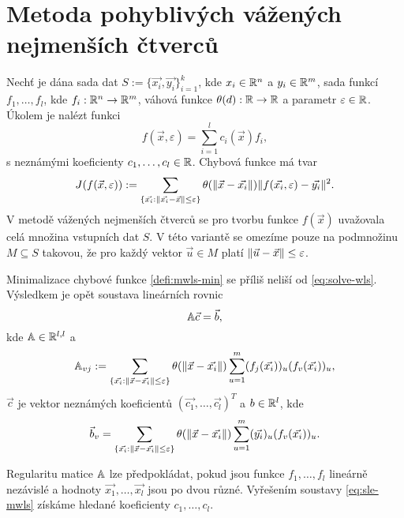 \section{Metoda pohyblivých vážených nejmenších čtverců}
\label{sec:mwls}

Nechť je dána sada dat $S := \{\vec{x_i}, \vec{y_i}\}_{i = 1}^k$, kde $x_i \in \mathbb{R}^n$ a $y_i \in \mathbb{R}^m$, sada funkcí $f_1,\ldots,f_l$, kde $f_i: \mathbb{R}^n \rightarrow \mathbb{R}^m$, váhová funkce $\theta(d): \mathbb{R} \rightarrow \mathbb{R}$ a parametr $\varepsilon \in \mathbb{R}$. Úkolem je nalézt funkci
\begin{equation}
  \label{defi:mwls}
  f(\vec{x},\varepsilon) = \sum_{i=1}^lc_i(\vec{x})f_i,
\end{equation}
s neznámými koeficienty $c_1, \ldots, c_l \in \mathbb{R}$. Chybová funkce má tvar
\begin{equation}
  \label{defi:mwls-min}
  J(f(\vec{x},\varepsilon)) := \sum_{\{\vec{x_i} : \|\vec{x_i} - \vec{x}\| \leq \varepsilon\}} \theta(\|\vec{x} - \vec{x_i}\|)\|f(\vec{x_i}, \varepsilon) - \vec{y_i}\|^2.
\end{equation}
V metodě vážených nejmenších čtverců se pro tvorbu funkce $f(\vec{x})$ uvažovala celá množina vstupních dat $S$. V této variantě se omezíme pouze na podmnožinu $M \subseteq S$ takovou, že pro každý vektor $\vec{u} \in M$ platí $\|\vec{u} - \vec{x}\| \leq \varepsilon$.

Minimalizace chybové funkce \ref{defi:mwls-min} se příliš neliší od \ref{eq:solve-wls}. Výsledkem je opět soustava lineárních rovnic
\begin{equation}
  \label{eq:sle-mwls}
  \mathbb{A}\vec{c} = \vec{b},
\end{equation}
kde $\mathbb{A} \in \mathbb{R}^{l,l}$ a
\begin{equation}
  \label{eq:solve-mwls-lhs}
  \mathbb{A}_{vj} := \sum_{\{\vec{x_i}: \|\vec{x} - \vec{x_i}\| \leq \varepsilon\}} \theta(\|\vec{x} - \vec{x_i}\|) \sum_{u = 1}^m (f_j(\vec{x_i}))_u (f_v(\vec{x_i}))_u,
\end{equation}
$\vec{c}$ je vektor neznámých koeficientů $(\vec{c_1}, \ldots, \vec{c_l})^T$ a $b \in \mathbb{R}^l$, kde
\begin{equation}
  \label{eq:solve-mwls-rhs}
  \vec{b}_v = \sum_{\{\vec{x_i}: \|\vec{x} - \vec{x_i}\| \leq \varepsilon \}} \theta(\|\vec{x} - \vec{x_i}\|) \sum_{u=1}^m (\vec{y_i})_u(f_v(\vec{x_i}))_u.
\end{equation}

Regularitu matice $\mathbb{A}$ lze předpokládat, pokud jsou funkce $f_1, \ldots, f_l$ lineárně nezávislé a hodnoty $\vec{x_1}, \ldots, \vec{x_l}$ jsou po dvou různé. Vyřešením soustavy \ref{eq:sle-mwls} získáme hledané koeficienty $c_1, \ldots, c_l$.

